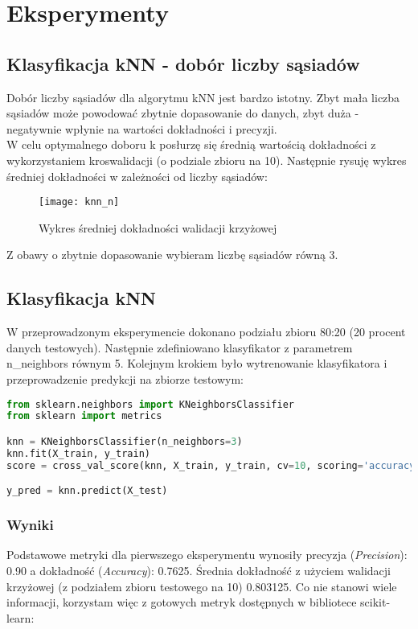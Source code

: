 \section{Eksperymenty}
\subsection{Klasyfikacja kNN - dobór liczby sąsiadów}
Dobór liczby sąsiadów dla algorytmu kNN jest bardzo istotny. Zbyt mała liczba sąsiadów może powodować zbytnie dopasowanie do danych, zbyt duża - negatywnie wpłynie na wartości dokładności i precyzji.\\

W celu optymalnego doboru k posłurzę się średnią wartością dokładności z wykorzystaniem kroswalidacji (o podziale zbioru na 10). Następnie rysuję wykres średniej dokładności w zależności od liczby sąsiadów:

\begin{figure}[H]
    \centering
    \texttt{[image: knn\_n]}
    \caption{Wykres średniej dokładności walidacji krzyżowej}
    \label{fig:knn_n}
\end{figure}

Z obawy o zbytnie dopasowanie wybieram liczbę sąsiadów równą 3.

\subsection{Klasyfikacja kNN }
W przeprowadzonym eksperymencie dokonano podziału zbioru 80:20 (20 procent danych testowych). Następnie zdefiniowano klasyfikator z parametrem n\_neighbors równym 5. Kolejnym krokiem było wytrenowanie klasyfikatora i przeprowadzenie predykcji na zbiorze testowym:\\

\begin{lstlisting}[language=Python, caption=Definicja i użycie kNN]
from sklearn.neighbors import KNeighborsClassifier
from sklearn import metrics

knn = KNeighborsClassifier(n_neighbors=3)
knn.fit(X_train, y_train)
score = cross_val_score(knn, X_train, y_train, cv=10, scoring='accuracy')

y_pred = knn.predict(X_test)
\end{lstlisting}

\subsubsection{Wyniki}
Podstawowe metryki dla pierwszego eksperymentu wynosiły precyzja (\textit{Precision}): 0.90 a dokładność (\textit{Accuracy}): 0.7625. Średnia dokładność z użyciem walidacji krzyżowej (z podziałem zbioru testowego na 10) 0.803125. Co nie stanowi wiele informacji, korzystam więc z gotowych metryk dostępnych w bibliotece scikit-learn:\\

